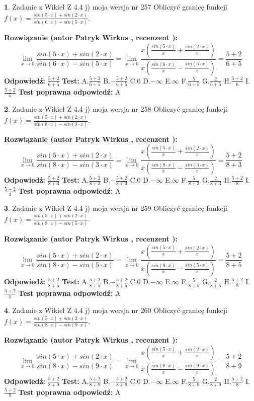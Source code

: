 \documentclass[12pt, a4paper]{article}
\theoremstyle{definition} %
\newtheorem{zad}{}
\newcommand{\zadStart}[1]{\begin{zad}#1\newline}
\newcommand{\zadStop}{\end{zad}}
\newcommand{\rozwStart}[2]{\noindent \textbf{Rozwiązanie (autor #1 , recenzent #2): }\newline}
\newcommand{\rozwStop}{\newline}
\newcommand{\odpStart}{\noindent \textbf{Odpowiedź:}\newline}
\newcommand{\odpStop}{\newline}
\newcommand{\testStart}{\noindent \textbf{Test:}\newline}
\newcommand{\testStop}{\newline}
\newcommand{\kluczStart}{\noindent \textbf{Test poprawna odpowiedź:}\newline}
\newcommand{\kluczStop}{\newline}
\begin{document}
\zadStart{Zadanie z Wikieł Z 4.4 j) moja wersja nr 257}
Obliczyć granicę funkcji $f(x)=\frac{sin(5\cdot x) +sin(2\cdot x)}{sin(6\cdot x) -sin(5\cdot x)}$.
\zadStop
\rozwStart{Patryk Wirkus}{}
$$\lim\limits_{x\to 0}\frac{sin(5\cdot x) +sin(2\cdot x)}{sin(6\cdot x) -sin(5\cdot x)}=\lim\limits_{x\to 0}\frac{x(\frac{sin(5\cdot x)}{x}+\frac{sin(2\cdot x)}{x})}{x(\frac{sin(6\cdot x)}{x}-\frac{sin(5\cdot x)}{x})}=\frac{5+2}{6+5}$$
\rozwStop
\odpStart
$\frac{5+2}{6+5}$
\odpStop
\testStart
A.$\frac{5+2}{6+5}$
B.$-\frac{5+2}{6+5}$
C.$0$
D.$-\infty$
E.$\infty$
F.$\frac{5}{6+5}$
G.$\frac{2}{6+5}$
H.$\frac{5+2}{6}$
I.$\frac{5+2}{5}$
\testStop
\kluczStart
A
\kluczStop



\zadStart{Zadanie z Wikieł Z 4.4 j) moja wersja nr 258}
Obliczyć granicę funkcji $f(x)=\frac{sin(5\cdot x) +sin(2\cdot x)}{sin(8\cdot x) -sin(3\cdot x)}$.
\zadStop
\rozwStart{Patryk Wirkus}{}
$$\lim\limits_{x\to 0}\frac{sin(5\cdot x) +sin(2\cdot x)}{sin(8\cdot x) -sin(3\cdot x)}=\lim\limits_{x\to 0}\frac{x(\frac{sin(5\cdot x)}{x}+\frac{sin(2\cdot x)}{x})}{x(\frac{sin(8\cdot x)}{x}-\frac{sin(3\cdot x)}{x})}=\frac{5+2}{8+3}$$
\rozwStop
\odpStart
$\frac{5+2}{8+3}$
\odpStop
\testStart
A.$\frac{5+2}{8+3}$
B.$-\frac{5+2}{8+3}$
C.$0$
D.$-\infty$
E.$\infty$
F.$\frac{5}{8+3}$
G.$\frac{2}{8+3}$
H.$\frac{5+2}{8}$
I.$\frac{5+2}{3}$
\testStop
\kluczStart
A
\kluczStop



\zadStart{Zadanie z Wikieł Z 4.4 j) moja wersja nr 259}
Obliczyć granicę funkcji $f(x)=\frac{sin(5\cdot x) +sin(2\cdot x)}{sin(8\cdot x) -sin(5\cdot x)}$.
\zadStop
\rozwStart{Patryk Wirkus}{}
$$\lim\limits_{x\to 0}\frac{sin(5\cdot x) +sin(2\cdot x)}{sin(8\cdot x) -sin(5\cdot x)}=\lim\limits_{x\to 0}\frac{x(\frac{sin(5\cdot x)}{x}+\frac{sin(2\cdot x)}{x})}{x(\frac{sin(8\cdot x)}{x}-\frac{sin(5\cdot x)}{x})}=\frac{5+2}{8+5}$$
\rozwStop
\odpStart
$\frac{5+2}{8+5}$
\odpStop
\testStart
A.$\frac{5+2}{8+5}$
B.$-\frac{5+2}{8+5}$
C.$0$
D.$-\infty$
E.$\infty$
F.$\frac{5}{8+5}$
G.$\frac{2}{8+5}$
H.$\frac{5+2}{8}$
I.$\frac{5+2}{5}$
\testStop
\kluczStart
A
\kluczStop



\zadStart{Zadanie z Wikieł Z 4.4 j) moja wersja nr 260}
Obliczyć granicę funkcji $f(x)=\frac{sin(5\cdot x) +sin(2\cdot x)}{sin(8\cdot x) -sin(9\cdot x)}$.
\zadStop
\rozwStart{Patryk Wirkus}{}
$$\lim\limits_{x\to 0}\frac{sin(5\cdot x) +sin(2\cdot x)}{sin(8\cdot x) -sin(9\cdot x)}=\lim\limits_{x\to 0}\frac{x(\frac{sin(5\cdot x)}{x}+\frac{sin(2\cdot x)}{x})}{x(\frac{sin(8\cdot x)}{x}-\frac{sin(9\cdot x)}{x})}=\frac{5+2}{8+9}$$
\rozwStop
\odpStart
$\frac{5+2}{8+9}$
\odpStop
\testStart
A.$\frac{5+2}{8+9}$
B.$-\frac{5+2}{8+9}$
C.$0$
D.$-\infty$
E.$\infty$
F.$\frac{5}{8+9}$
G.$\frac{2}{8+9}$
H.$\frac{5+2}{8}$
I.$\frac{5+2}{9}$
\testStop
\kluczStart
A
\kluczStop
\end{document}
